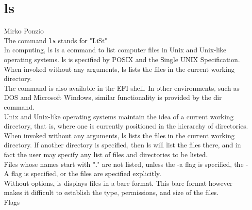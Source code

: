 \documentclass[hidelinks,12pt,a4paper,numbers=enddot]{scrartcl}
\begin{document}
\section{ls}


\large Mirko Ponzio \normalsize\\


The command \texttt{ls} stands for "LiSt"\\

In computing, ls is a command to list computer files in Unix and Unix-like operating systems.
ls is specified by POSIX and the Single UNIX Specification.\\
When invoked without any arguments, ls lists the files in the current working directory.\\
The command is also available in the EFI shell. In other environments, such as DOS and Microsoft
Windows, similar functionality is provided by the dir command.\\

Unix and Unix-like operating systems maintain the idea of a current working directory,
that is, where one is currently positioned in the hierarchy of directories.\\
When invoked without any arguments, ls lists the files in the current working directory.
If another directory is specified, then ls will list the files there, and in fact the user may
specify any list of files and directories to be listed.\\

Files whose names start with "." are not listed, unless the -a flag is specified,
the -A flag is specified, or the files are specified explicitly.\\

Without options, ls displays files in a bare format. This bare format however makes
it difficult to establish the type, permissions, and size of the files.\\

Flags
\end{document}
